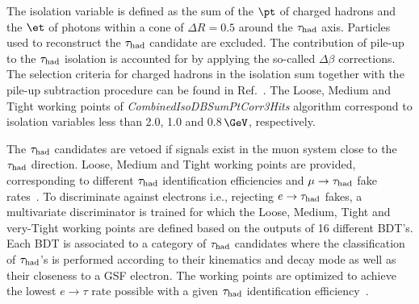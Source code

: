 The isolation variable is defined as the sum of the $\pt$ of charged hadrons and the $\et$ of photons within a cone of $\Delta R = 0.5$ around the $\tau_{\rm had}$ axis. Particles used to reconstruct the $\tau_{\rm had}$ candidate are excluded. The contribution of pile-up to the $\tau_{\rm had}$ isolation is accounted for by applying the so-called $\Delta\beta$ corrections. The selection criteria for charged hadrons in the isolation sum together with the pile-up subtraction procedure can be found in Ref.~\cite{CMS_AN_2013-171}. The Loose, Medium and Tight working points of {\it CombinedIsoDBSumPtCorr3Hits} algorithm correspond to isolation variables less than 2.0, 1.0 and 0.8\,$\GeV$, respectively.

The $\tau_{\rm had}$ candidates are vetoed if signals exist in the muon system close to the $\tau_{\rm had}$ direction. Loose, Medium and Tight working points are provided, corresponding to different $\tau_{\rm had}$ identification efficiencies and $\mu\to\tau_{\rm had}$ fake rates~\cite{CMS_AN_2013-171}. To discriminate against electrons i.e., rejecting $e\to\tau_{\rm had}$ fakes, a multivariate discriminator is trained for which the Loose, Medium, Tight and very-Tight working points are defined based on the outputs of 16 different BDT's. Each BDT is associated to a category of $\tau_{\rm had}$ candidates where the classification of $\tau_{\rm had}$'s is performed according to their kinematics and decay mode as well as their closeness to a GSF electron. The working points are optimized to achieve the lowest $e\to\tau$ rate possible with a given $\tau_{\rm had}$ identification efficiency~\cite{CMS_AN_2012-417}.

